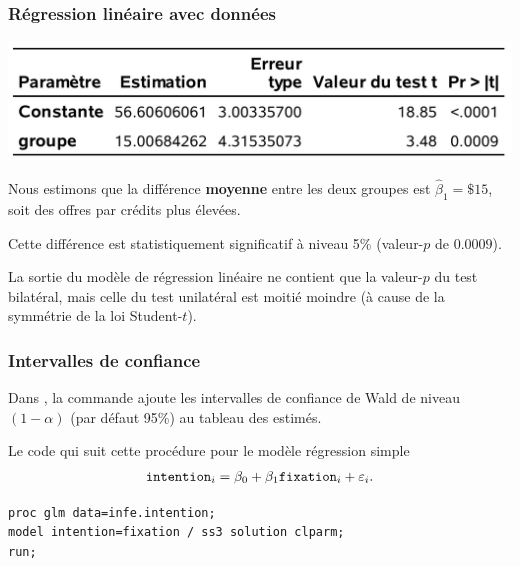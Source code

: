\documentclass[xcolor={dvipsnames}]{beamer}
\begin{document}
\begin{frame}[fragile]
\frametitle{Régression linéaire avec données }

\begin{center}
\includegraphics[width =0.9\linewidth]{img/c2/diapos3-e14}
\end{center}
\bi
\item Nous estimons que la différence \textbf{moyenne}  entre les deux groupes est $\widehat{\beta}_1=\$15$, soit des offres par crédits plus élevées. 
\item Cette différence est statistiquement significatif à niveau 5\% (valeur-$p$ de $0.0009$).
\item La sortie du modèle de régression linéaire ne contient que la valeur-$p$ du test bilatéral, mais celle du test unilatéral est moitié moindre (à cause de la symmétrie de la loi Student-$t$).
\ei
\end{frame}



 
 \begin{frame}[fragile]
\frametitle{Intervalles de confiance}
Dans \SASlang, la commande  ajoute les intervalles de confiance de Wald de niveau $(1-\alpha)$ (par défaut 95\%) au tableau des estimés.
\bi
\item Le code qui suit cette procédure pour le modèle régression simple
\ei
\begin{align*}
\texttt{intention}_i = \beta_0 + \beta_1 \texttt{fixation}_i + \varepsilon_i.
\end{align*}

\begin{tcolorbox}[colback=white, colframe=hecblue, title=Code \SASlang pour ajuster le modèle linéaire]
\begin{verbatim}
proc glm data=infe.intention;
model intention=fixation / ss3 solution clparm;
run;
\end{verbatim}
\end{tcolorbox}


\end{frame}


 
\end{document}
